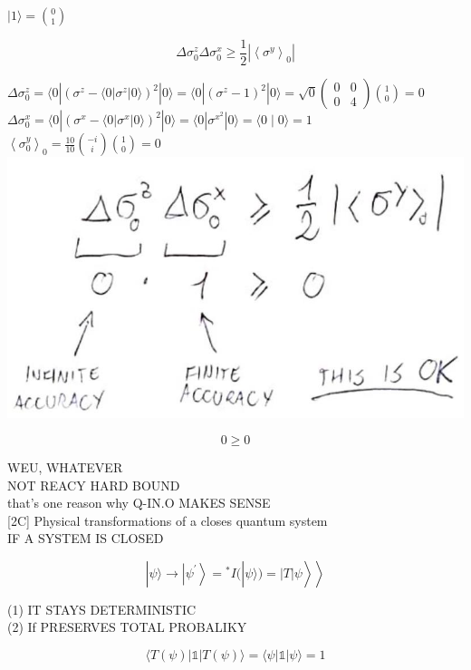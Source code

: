 \documentclass[10pt]{article}
\begin{document}
$|1\rangle=\binom{0}{1}$

$$
\Delta \sigma_{0}^{z} \Delta \sigma_{0}^{x} \geqslant \frac{1}{2}\left|\left\langle\sigma^{y}\right\rangle_{0}\right|
$$

$\Delta \sigma_{0}^{z}=\langle 0|\left(\sigma^{z}-\langle 0| \sigma^{z}|0\rangle\right)^{2}|0\rangle=\langle 0|\left(\sigma^{z}-1\right)^{2}|0\rangle=\sqrt{0}\left(\begin{array}{ll}0 & 0 \\ 0 & 4\end{array}\right)\binom{1}{0}=0$\\
$\Delta \sigma_{0}^{x}=\langle 0|\left(\sigma^{x}-\langle 0| \sigma^{x}|0\rangle\right)^{2}|0\rangle=\langle 0| \sigma^{x^{2}}|0\rangle=\langle 0 \mid 0\rangle=1$\\
$\left\langle\sigma_{0}^{y}\right\rangle_{0}=\frac{10}{10}\binom{-i}{i}\binom{1}{0}=0$\\
\includegraphics[max width=\textwidth, center]{2025_10_16_f02af6fa434c9f0bcc00g-07}

$$
0 \geqslant 0
$$

WEU, WHATEVER\\
NOT REACY HARD BOUND\\
that's one reason why Q-IN.O MAKES SENSE\\[0pt]
[2C] Physical transformations of a closes quantum system\\
IF A SYSTEM IS CLOSED

$$
\left.\left.|\psi\rangle \rightarrow\left|\psi^{\prime}\right\rangle={ }^{*} I(|\psi\rangle)=|T| \psi\right\rangle\right\rangle
$$

(1) IT STAYS DETERMINISTIC\\
(2) If PRESERVES TOTAL PROBALIKY

$$
\langle T(\psi)| \mathbb{1}|T(\psi)\rangle=\langle\psi| \mathbb{1}|\psi\rangle=1
$$
\end{document}
